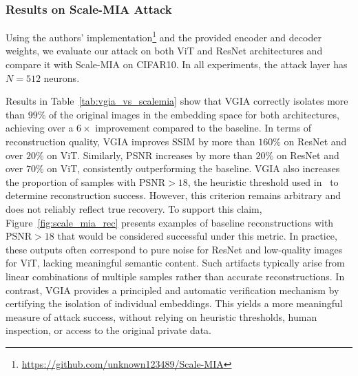 \subsubsection{Results on Scale-MIA Attack}

Using the authors’ implementation\footnote{\url{https://github.com/unknown123489/Scale-MIA}} and the provided encoder and decoder weights, we evaluate our attack on both ViT and ResNet architectures and compare it with Scale-MIA on CIFAR10. In all experiments, the attack layer has $N=512$ neurons.

Results in Table~\ref{tab:vgia_vs_scalemia} show that VGIA correctly isolates more than $99\%$ of the original images in the embedding space for both architectures, achieving over a $6\times$ improvement compared to the baseline. In terms of reconstruction quality, VGIA improves SSIM by more than $160\%$ on ResNet and over $20\%$ on ViT. Similarly, PSNR increases by more than $20\%$ on ResNet and over $70\%$ on ViT, consistently outperforming the baseline. VGIA also increases the proportion of samples with $\text{PSNR} > 18$, the heuristic threshold used in~\cite{shiScaleMIAScalableModel2025} to determine reconstruction success. However, this criterion remains arbitrary and does not reliably reflect true recovery. To support this claim, Figure~\ref{fig:scale_mia_rec} presents examples of baseline reconstructions with $\text{PSNR} > 18$ that would be considered successful under this metric. In practice, these outputs often correspond to pure noise for ResNet and low-quality images for ViT, lacking meaningful semantic content. Such artifacts typically arise from linear combinations of multiple samples rather than accurate reconstructions. In contrast, VGIA provides a principled and automatic verification mechanism by certifying the isolation of individual embeddings. This yields a more meaningful measure of attack success, without relying on heuristic thresholds, human inspection, or access to the original private data.

